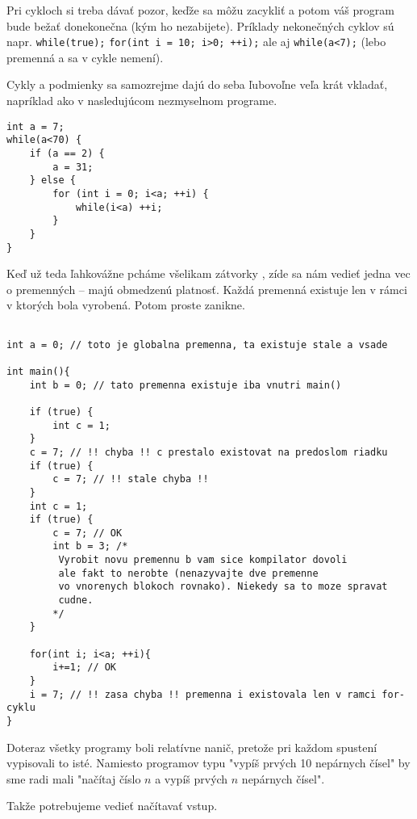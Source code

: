 Pri cykloch si treba dávať pozor, keďže sa môžu zacykliť a potom váš program
bude bežať donekonečna (kým ho nezabijete).  Príklady nekonečných cyklov sú
napr. \verb!while(true);! \verb!for(int i = 10; i>0; ++i);! ale aj
\verb!while(a<7);! (lebo premenná a sa v cykle nemení).

\medskip

Cykly a podmienky sa samozrejme dajú do seba ľubovoľne veľa krát vkladať, napríklad ako v nasledujúcom
nezmyselnom programe.

\begin{lstlisting}
int a = 7;
while(a<70) {
    if (a == 2) {
        a = 31;
    } else {
        for (int i = 0; i<a; ++i) {
            while(i<a) ++i;
        }
    }
}
\end{lstlisting}

\medskip

Keď už teda ľahkovážne pcháme všelikam zátvorky {}, zíde sa nám vedieť jedna vec o premenných
-- majú obmedzenú platnosť. Každá premenná existuje len v rámci ${}$ v ktorých bola vyrobená. 
Potom proste zanikne.

\begin{lstlisting}

int a = 0; // toto je globalna premenna, ta existuje stale a vsade

int main(){
    int b = 0; // tato premenna existuje iba vnutri main()

    if (true) {
        int c = 1;
    }
    c = 7; // !! chyba !! c prestalo existovat na predoslom riadku
    if (true) {
        c = 7; // !! stale chyba !!
    }
    int c = 1;
    if (true) {
        c = 7; // OK
        int b = 3; /*
         Vyrobit novu premennu b vam sice kompilator dovoli
         ale fakt to nerobte (nenazyvajte dve premenne
         vo vnorenych blokoch rovnako). Niekedy sa to moze spravat
         cudne.
        */
    }    

    for(int i; i<a; ++i){
        i+=1; // OK
    }
    i = 7; // !! zasa chyba !! premenna i existovala len v ramci for-cyklu
}

\end{lstlisting}


Doteraz všetky programy boli relatívne nanič, pretože pri každom spustení
vypisovali to isté.  Namiesto programov typu "vypíš prvých 10 nepárnych čísel"
by sme radi mali "načítaj číslo $n$ a vypíš prvých $n$ nepárnych čísel".

Takže potrebujeme vedieť načítavať vstup.

